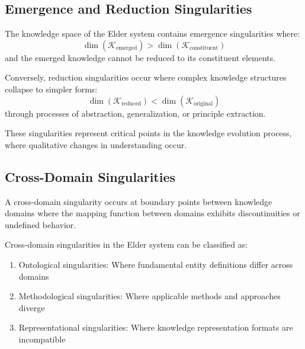 \subsection{Emergence and Reduction Singularities}

\begin{theorem}
The knowledge space of the Elder system contains emergence singularities where:
\begin{equation}
\dim(\mathcal{K}_{\text{emerged}}) > \dim(\mathcal{K}_{\text{constituent}})
\end{equation}
and the emerged knowledge cannot be reduced to its constituent elements.
\end{theorem}

\begin{theorem}
Conversely, reduction singularities occur where complex knowledge structures collapse to simpler forms:
\begin{equation}
\dim(\mathcal{K}_{\text{reduced}}) < \dim(\mathcal{K}_{\text{original}})
\end{equation}
through processes of abstraction, generalization, or principle extraction.
\end{theorem}

These singularities represent critical points in the knowledge evolution process, where qualitative changes in understanding occur.

\subsection{Cross-Domain Singularities}

\begin{definition}
A cross-domain singularity occurs at boundary points between knowledge domains where the mapping function between domains exhibits discontinuities or undefined behavior.
\end{definition}

\begin{theorem}
Cross-domain singularities in the Elder system can be classified as:
\begin{enumerate}
    \item Ontological singularities: Where fundamental entity definitions differ across domains
    \item Methodological singularities: Where applicable methods and approaches diverge
    \item Representational singularities: Where knowledge representation formats are incompatible
\end{enumerate}
\end{theorem}


